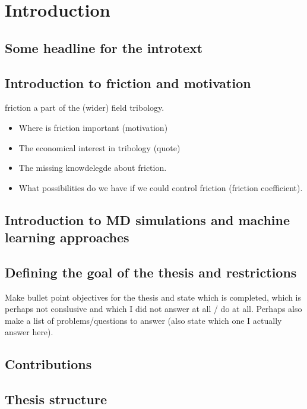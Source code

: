 \chapter*{Introduction}

\section{Some headline for the introtext}

\section{Introduction to friction and motivation}
friction a part of the (wider) field tribology.

\begin{itemize}
    \item Where is friction important (motivation)
    \item The economical interest in tribology (quote)
    \item The missing knowdelegde about friction.
    \item What possibilities do we have if we could control friction (friction coefficient).
\end{itemize}


\section{Introduction to MD simulations and machine learning approaches}

\section{Defining the goal of the thesis and restrictions}
Make bullet point objectives for the thesis and state which is completed, which is perhaps not conslusive and which I did not answer at all / do at all. Perhaps also make a list of problems/questions to answer (also state which one I actually answer here).


\section{Contributions}

\section{Thesis structure }

